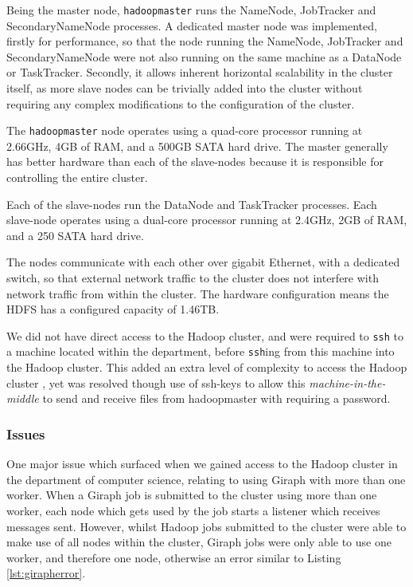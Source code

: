 Being the master node, {\tt hadoopmaster} runs the NameNode, JobTracker and SecondaryNameNode processes. A dedicated master node was implemented, firstly for performance, so that the node running the NameNode, JobTracker and SecondaryNameNode were not also running on the same machine as a DataNode or TaskTracker. Secondly, it allows inherent horizontal scalability in the cluster itself, as more slave nodes can be trivially added into the cluster without requiring any complex modifications to the configuration of the cluster. 

The {\tt hadoopmaster} node operates using a quad-core processor running at 2.66GHz, 4GB of RAM, and a 500GB SATA hard drive. The master generally has better hardware than each of the slave-nodes because it is responsible for controlling the entire cluster.

Each of the slave-nodes run the DataNode and TaskTracker processes. Each slave-node operates using a dual-core processor running at 2.4GHz, 2GB of RAM, and a 250 SATA hard drive.

The nodes communicate with each other over gigabit Ethernet, with a dedicated switch, so that external network traffic to the cluster does not interfere with network traffic from within the cluster. The hardware configuration means the HDFS has a configured capacity of 1.46TB.

We did not have direct access to the Hadoop cluster, and were required to {\tt ssh} to a machine located within the department, before {\tt ssh}ing from this machine into the Hadoop cluster. This added an extra level of complexity to access the Hadoop cluster , yet was resolved though use of ssh-keys to allow this \emph{machine-in-the-middle} to send and receive files from hadoopmaster with requiring a password.

\subsubsection{Issues}
One major issue which surfaced when we gained access to the Hadoop cluster in the department of computer science, relating to using Giraph with more than one worker. When a Giraph job is submitted to the cluster using more than one worker, each node which gets used by the job starts a listener which receives messages sent. However, whilst Hadoop jobs submitted to the cluster were able to make use of all nodes within the cluster, Giraph jobs were only able to use one worker, and therefore one node, otherwise an error similar to Listing \ref{lst:girapherror}.

